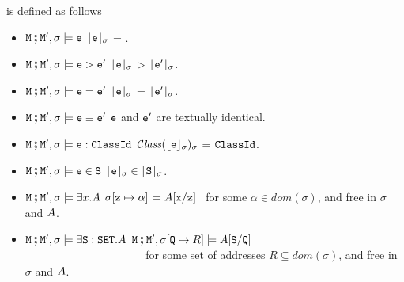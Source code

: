 \begin{definition} is defined  as follows
\label{def:valid:assertion}
\begin{itemize}
\item
$\M\mkpair \M', \sigma \models\SE$ \IFF  $\interp{\SE}{\sigma}$ = .
\item
$\M\mkpair \M', \sigma \models\SE>\SEPrime$ \IFF $\interp{\SE}{\sigma}$ > $\interp{\SEPrime}{\sigma}$.
\item
$\M\mkpair \M', \sigma \models\SE=\SEPrime$ \IFF $\interp{\SE}{\sigma}$ = $\interp{\SEPrime}{\sigma}$.
\item
$\M\mkpair \M', \sigma \models\SE\equiv\SEPrime$ \IFF $\SE$ and $\SEPrime$ are textually identical.
\item
$\M\mkpair \M', \sigma \models \SE:\prg{ClassId}$ \IFF $\ClassOf {\interp{\SE}{\sigma}} {\sigma}$ = $\prg{ClassId}$.
\item
$\M\mkpair \M', \sigma \models \SE\in \prg{S}$ \IFF $\interp{\SE}{\sigma}\in \interp{\prg{S}}{\sigma}$.
\item
$\M\mkpair \M', \sigma \models \exists x.\A$ \IFF  
$\sigma[\prg{z}\mapsto \alpha] \models  \A[\prg{x}/\prg{z}]$ \ for some  $\alpha\in dom(\sigma)$, and    free in $\sigma$ and $\A$.\item
$\M\mkpair \M', \sigma \models \exists \prg{S}:\prg{SET}.\A$ \IFF  $\M\mkpair \M', \sigma[\prg{Q}\mapsto R] \models  \A[\prg{S}/\prg{Q}]$ \\
$\strut ~ \hspace{1.4in} $ for some set of addresses $R\subseteq dom(\sigma)$, and    free in $\sigma$ and $\A$.
 

\end{itemize}
\end{definition}
